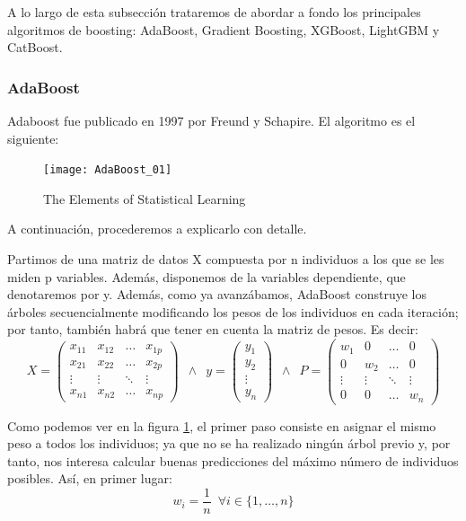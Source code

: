 \documentclass[12pt,twoside]{article}
\begin{document}
A lo largo de esta subsección trataremos de abordar a fondo los principales algoritmos de boosting: AdaBoost, Gradient Boosting, XGBoost, LightGBM y CatBoost.


\subsubsection{AdaBoost}
Adaboost fue publicado en 1997 por Freund y Schapire. El algoritmo es el siguiente:
\begin{figure}[h]
\centering
\texttt{[image: AdaBoost\_01]}
\caption{The Elements of Statistical Learning}
\label{fig: AdaBoost_01}
\end{figure}

A continuación, procederemos a explicarlo con detalle.

Partimos de una matriz de datos X compuesta por n individuos a los que se les miden p variables. Además, disponemos de la variables dependiente, que denotaremos por y. Además, como ya avanzábamos, AdaBoost construye los árboles secuencialmente modificando los pesos de los individuos en cada iteración; por tanto, también habrá que tener en cuenta la matriz de pesos. Es decir:
\begin{equation*}
X =
\begin{pmatrix}
x_{11} & x_{12} & \dots & x_{1p} \\
x_{21} & x_{22} & \dots & x_{2p} \\
\vdots & \vdots & \ddots & \vdots \\
x_{n1} & x_{n2} & \dots & x_{np} 
\end{pmatrix}
\, \, \, 
\wedge
\, \, \,
y = 
\begin{pmatrix}
y_1 \\
y_2 \\
\vdots \\
y_n
\end{pmatrix}
\, \, \,
\wedge
\, \, \,
P =
\begin{pmatrix}
w_1 & 0 & \dots & 0 \\
0 & w_2 & \dots & 0 \\
\vdots & \vdots & \ddots & \vdots \\
0 & 0 & \dots & w_n
\end{pmatrix}
\end{equation*}

Como podemos ver en la figura \ref{fig: AdaBoost_01}, el primer paso consiste en asignar el mismo peso a todos los individuos; ya que no se ha realizado ningún árbol previo y, por tanto, nos interesa calcular buenas predicciones del máximo número de individuos posibles. Así, en primer lugar:
\begin{equation*}
w_i = \frac{1}{n} \, \, \, \forall i \in \{1, \dots, n \}
\end{equation*}
\end{document}
